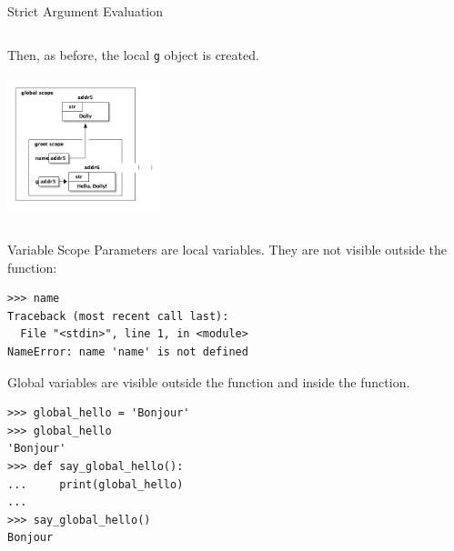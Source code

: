 \documentclass[smaller, aspectratio=1610]{beamer}
\begin{document}
\begin{frame}[label={sec:org9f752d9},fragile]{Strict Argument Evaluation}
\begin{columns}
\begin{column}{0.3\columnwidth}
\begin{block}{}
Then, as before, the local \texttt{g} object is created.

\begin{center}
\includegraphics[width=1.75in]{diagrams/greet-again-scope.png}
\end{center}
\end{block}
\end{column}
\end{columns}
\end{frame}



\begin{frame}[label={sec:org85a4f36},fragile]{Variable Scope}
 Parameters are local variables. They are not visible outside the function:

\lstset{language=Python,label= ,caption= ,captionpos=b,numbers=none}
\begin{lstlisting}
>>> name
Traceback (most recent call last):
  File "<stdin>", line 1, in <module>
NameError: name 'name' is not defined
\end{lstlisting}

Global variables are visible outside the function and inside the function.

\lstset{language=Python,label= ,caption= ,captionpos=b,numbers=none}
\begin{lstlisting}
>>> global_hello = 'Bonjour'
>>> global_hello
'Bonjour'
>>> def say_global_hello():
...     print(global_hello)
...
>>> say_global_hello()
Bonjour
\end{lstlisting}
\end{frame}
\end{document}

